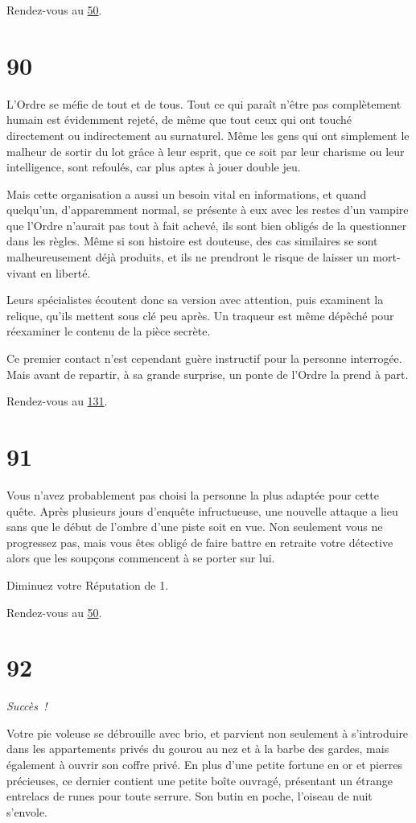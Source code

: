 \documentclass{report}
\newcommand{\gsection}[1]{
    \section{#1}
    \label{section-#1}
}
\newcommand{\glink}[1]{\hyperref[section-#1]{#1}}
\newcommand{\success}{\emph{Succès !}}
\begin{document}
Rendez-vous au \glink{50}.

\gsection{90}

L'Ordre se méfie de tout et de tous. Tout ce qui paraît n'être pas complètement humain est évidemment rejeté, de même que tout ceux qui ont touché directement ou indirectement au surnaturel. Même les gens qui ont simplement le malheur de sortir du lot grâce à leur esprit, que ce soit par leur charisme ou leur intelligence, sont refoulés, car plus aptes à jouer double jeu.

Mais cette organisation a aussi un besoin vital en informations, et quand quelqu'un, d'apparemment normal, se présente à eux avec les restes d'un vampire que l'Ordre n'aurait pas tout à fait achevé, ils sont bien obligés de la questionner dans les règles. Même si son histoire est douteuse, des cas similaires se sont malheureusement déjà produits, et ils ne prendront le risque de laisser un mort-vivant en liberté.

Leurs spécialistes écoutent donc sa version avec attention, puis examinent la relique, qu'ils mettent sous clé peu après. Un traqueur est même dépêché pour réexaminer le contenu de la pièce secrète.

Ce premier contact n'est cependant guère instructif pour la personne interrogée. Mais avant de repartir, à sa grande surprise, un ponte de l'Ordre la prend à part.

Rendez-vous au \glink{131}.

\gsection{91}

Vous n'avez probablement pas choisi la personne la plus adaptée pour cette quête. Après plusieurs jours d'enquête infructueuse, une nouvelle attaque a lieu sans que le début de l'ombre d'une piste soit en vue. Non seulement vous ne progressez pas, mais vous êtes obligé de faire battre en retraite votre détective alors que les soupçons commencent à se porter sur lui. 

Diminuez votre Réputation de 1.

Rendez-vous au \glink{50}.

\gsection{92}

\success

Votre pie voleuse se débrouille avec brio, et parvient  non seulement à s'introduire dans les appartements privés du gourou au nez et à la barbe des gardes, mais également à ouvrir son coffre privé. En plus d'une petite fortune en or et pierres précieuses, ce dernier contient une petite boîte ouvragé, présentant un étrange entrelacs de runes pour toute serrure. Son butin en poche, l'oiseau de nuit s'envole.
\end{document}
